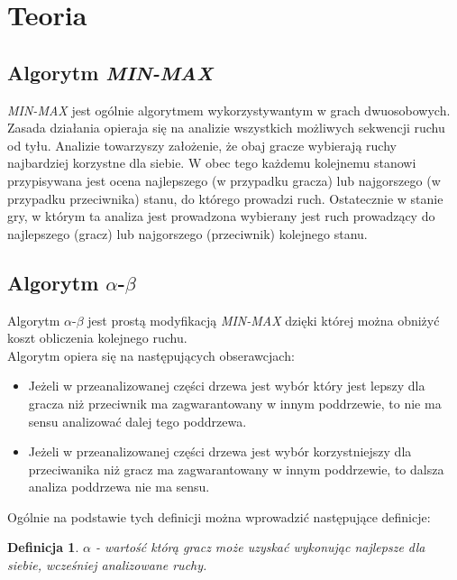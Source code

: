 \documentclass[a4paper,12pt]{article}
\newtheorem{df}{Definicja}
\begin{document}
\section{Teoria}
\subsection{Algorytm \textit{MIN-MAX}}

\textit{MIN-MAX} jest ogólnie algorytmem wykorzystywantym w grach dwuosobowych. Zasada działania
opieraja się na analizie wszystkich możliwych sekwencji ruchu od tyłu. Analizie
towarzyszy założenie, że obaj gracze wybierają ruchy najbardziej korzystne
dla siebie. W obec tego każdemu kolejnemu stanowi przypisywana jest ocena
najlepszego (w przypadku gracza) lub najgorszego (w przypadku przeciwnika)
stanu, do którego prowadzi ruch. Ostatecznie w stanie gry, w którym ta analiza
jest prowadzona wybierany jest ruch prowadzący do najlepszego (gracz) lub najgorszego
(przeciwnik) kolejnego stanu.

\subsection{Algorytm $\alpha$-$\beta$}

Algorytm $\alpha$-$\beta$ jest prostą modyfikacją \textit{MIN-MAX} dzięki której można
obniżyć koszt obliczenia kolejnego ruchu.\\

Algorytm opiera się na następujących obserawcjach:

\begin{itemize}
\item
	Jeżeli w przeanalizowanej części drzewa jest wybór który jest lepszy dla gracza niż przeciwnik
	ma zagwarantowany w innym poddrzewie, to nie ma sensu analizować dalej tego poddrzewa.

\item
	Jeżeli w przeanalizowanej części drzewa jest wybór korzystniejszy dla przeciwanika niż
	gracz ma zagwarantowany w innym poddrzewie, to dalsza analiza poddrzewa nie ma sensu.
\end{itemize}

Ogólnie na podstawie tych definicji można wprowadzić następujące definicje:

\begin{df}
	$\alpha$ - wartość którą gracz może uzyskać wykonując najlepsze dla siebie, wcześniej analizowane ruchy.
\end{df}
\end{document}
